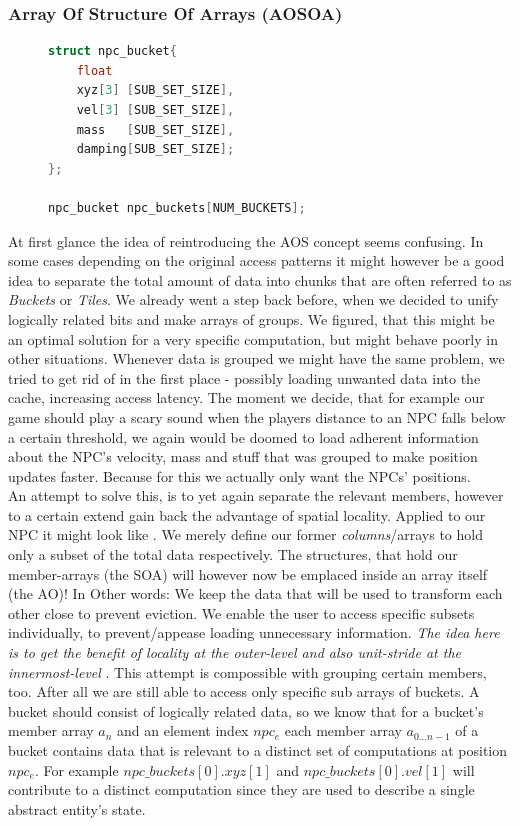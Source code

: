 \subsubsection{Array Of Structure Of Arrays (AOSOA)}\label{aosoa}
\begin{figure}
\vspace{-1.4cm}
\begin{lstlisting}[language=C++,numbers=none,name={AOSOA variant of grouped NPC traits},label={aosoa_npc}]
struct npc_bucket{
	float
	xyz[3] [SUB_SET_SIZE],
	vel[3] [SUB_SET_SIZE],
	mass   [SUB_SET_SIZE],
	damping[SUB_SET_SIZE];
};

npc_bucket npc_buckets[NUM_BUCKETS];
\end{lstlisting}
\end{figure}
At first glance the idea of reintroducing the AOS concept seems confusing. In some cases depending on the original access patterns it might however be a good idea to separate the total amount of data into chunks that are often referred to as \textit{Buckets} or \textit{Tiles}. We already went a step back before, when we decided to unify logically related bits and make arrays of groups. We figured, that this might be an optimal solution for a very specific computation, but might behave poorly in other situations. Whenever data is grouped we might have the same problem, we tried to get rid of in the first place - possibly loading unwanted data into the cache, increasing access latency. The moment we decide, that for example our game should play a scary sound when the players distance to an NPC falls below a certain threshold, we again would be doomed to load adherent information about the NPC's velocity, mass and stuff that was grouped to make position updates faster. Because for this we actually only want the NPCs' positions.\\
An attempt to solve this, is to yet again separate the relevant members, however to a certain extend gain back the advantage of spatial locality. Applied to our NPC it might look like . We merely define our former \textit{columns}/arrays to hold only a subset of the total data respectively. The structures, that hold our member-arrays (the SOA) will however now be emplaced inside an array itself (the AO)! In Other words: We keep the data that will be used to transform each other close to prevent eviction. We enable the user to access specific subsets individually, to prevent/appease loading unnecessary information. \textit{The idea here is to get the benefit of locality at the outer-level and also unit-stride at the innermost-level} . This attempt is compossible with grouping certain members, too. After all we are still able to access only specific sub arrays of buckets. A bucket should consist of logically related data, so we know that for a bucket's member array $a_{n}$ and an element index $npc_{e}$ each member array $a_{0\dotsc n-1}$ of a bucket contains data that is relevant to a distinct set of computations at position $npc_{e}$. For example $npc\_buckets[0].xyz[1]$ and $npc\_buckets[0].vel[1]$ will contribute to a distinct computation since they are used to describe a single abstract entity's state.\\
